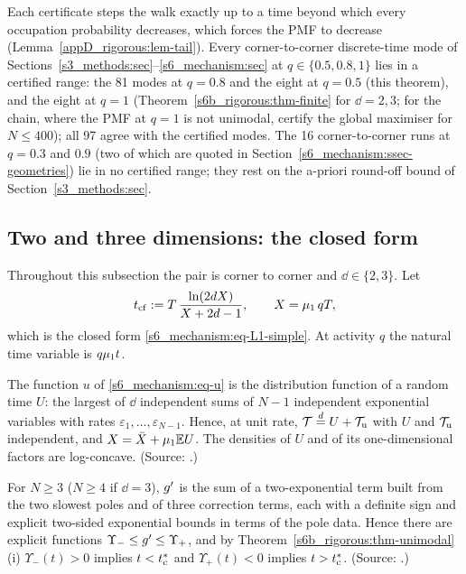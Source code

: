 Each certificate steps the walk exactly up to a time beyond which every occupation probability decreases, which forces
the PMF to decrease (Lemma~\ref{appD_rigorous:lem-tail}). Every corner-to-corner discrete-time mode of
Sections~\ref{s3_methods:sec}--\ref{s6_mechanism:sec} at $q\in\{0.5,0.8,1\}$ lies in a certified range: the 81 modes at
$q=0.8$ and the eight at $q=0.5$ (this theorem), and the eight at $q=1$ (Theorem~\ref{s6b_rigorous:thm-finite} for
$\dd=2,3$; for the chain, where the PMF at $q=1$ is not unimodal,  certify the global maximiser
for $N\le400$); all 97 agree with the certified modes. The 16 corner-to-corner runs at $q=0.3$ and $0.9$ (two of which
are quoted in Section~\ref{s6_mechanism:ssec-geometries}) lie in no certified range; they rest on the a-priori
round-off bound of Section~\ref{s3_methods:sec}.

\subsection{Two and three dimensions: the closed form}\label{s6b_rigorous:ssec-cf}

Throughout this subsection the pair is corner to corner and $\dd\in\{2,3\}$. Let
\[
t_{\mathrm{cf}}:=T\,\frac{\ln(2d X)}{X+2d-1},\qquad X=\mu_{1}\,qT ,
\]
which is the closed form \eqref{s6_mechanism:eq-L1-simple}. At activity $q$ the natural time variable is $q\mu_{1} t$.

\begin{proposition}\label{s6b_rigorous:prop-decomposition}
The function $u$ of \eqref{s6_mechanism:eq-u} is the distribution function of a random time $U$: the largest of $\dd$
independent sums of $N-1$ independent exponential variables with rates $\varepsilon_1,\dots,\varepsilon_{N-1}$. Hence, at
unit rate, $\mathcal{T}\overset{d}{=}U+\mathcal{T}_{\mathrm u}$ with $U$ and $\mathcal{T}_{\mathrm u}$ independent, and $X=\bar X+\mu_{1}\mathbb{E} U$. The
densities of $U$ and of its one-dimensional factors are log-concave.
\textup{(Source: .)}
\end{proposition}

\begin{theorem}\label{s6b_rigorous:thm-window}
For $N\ge3$ ($N\ge4$ if $\dd=3$), $g'$ is the sum of a two-exponential term built from the two slowest poles and of
three correction terms, each with a definite sign and explicit two-sided exponential bounds in terms of the pole data.
Hence there are explicit functions $\Upsilon_-\le g'\le\Upsilon_+$, and by Theorem~\ref{s6b_rigorous:thm-unimodal}(i)
$\Upsilon_-(t)>0$ implies $t<t^{*}_{\mathrm{c}}$ and $\Upsilon_+(t)<0$ implies $t>t^{*}_{\mathrm{c}}$.
\textup{(Source: .)}
\end{theorem}

